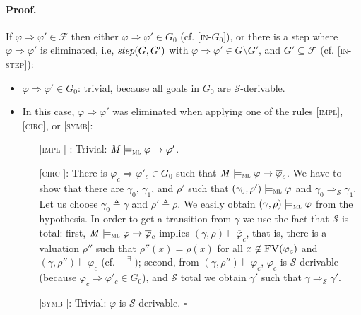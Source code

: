 \documentclass[conference]{IEEEtran}
\newcommand{\M}{\mathit{M}}
\newcommand{\eqbydef}{\triangleq}
\newcommand{\F}{\mathcal{F}}
\renewcommand{\S}{\mathcal{S}}
\newcommand{\tran}[2]{\Ra^{\!#1}_{\!#2}}
\newcommand{\Ra}{\Rightarrow}
\newcommand{\FreeVars}{\mathit{\textsc{FV}}}
\renewcommand{\implies}{\rightarrow}
\newcommand{\ML}{\textsc{ml}\xspace}
\newcommand{\rrule}[2]{{#1} \Ra{#2}}
\newcommand{\modelsml}{\models_\ML}
\newcommand{\coq}[1]{{\small \textit{#1}}}
\begin{document}
\paragraph{Proof.}
If $\rrule{\varphi}{\varphi'} \in \F$ then either $\rrule{\varphi}{\varphi'} \in G_0$ (cf. [\textsc{in-$G_0$}]), or there is a step where $\rrule{\varphi}{\varphi'}$ is eliminated, i.e, $\coq{step}(G, G')$ with $\rrule{\varphi}{\varphi'} \in G\!\setminus\!G'$, and  $G' \subseteq \F$ (cf. [\textsc{in-step}]):

\begin{itemize}
\item $\rrule{\varphi}{\varphi'} \in G_0$: trivial, because all goals in $G_0$  are $\S$-derivable.
\item %
In this case, $\rrule{\varphi}{\varphi'}$ was eliminated when applying one of the rules [\textsc{impl}], [\textsc{circ}], or [\textsc{symb}]:
\begin{enumerate}
\item [[\textsc{impl}\!\!]] : Trivial: $\M \modelsml \varphi \implies \varphi'$.
\item [[\textsc{circ}\!\!]]: There is $\rrule{\varphi_c}{\varphi'_c} \in G_0$ such that $\M \modelsml \varphi \implies \overline{\varphi}_c$.
We have to show that there are $\gamma_0$, $\gamma_1$, and $\rho'$ such that $(\gamma_0, \rho')\modelsml\varphi$ and $\gamma_0\tran{}{\S} \gamma_1$. 
Let us choose $\gamma_0 \eqbydef \gamma$ and $\rho' \eqbydef \rho$. 
We easily obtain $(\gamma, \rho)\modelsml \varphi$ from the hypothesis.
In order to get a transition from $\gamma$ we use the fact that $\S$ is total:
first, $\M \modelsml \varphi \implies \overline{\varphi}_c$ implies $(\gamma, \rho)\models \overline{\varphi}_c$, that is, there is a valuation $\rho''$ 
such that $\rho''(x) = \rho(x)$ for all $x \not\in\FreeVars(\varphi_c)$ and $(\gamma, \rho'')\models \varphi_c$ (cf. $\models^\exists$); second, from $(\gamma, \rho'')\models \varphi_c$, $\varphi_c$ is $\S$-derivable (because $\rrule{\varphi_c}{\varphi'_c} \in G_0$), and $\S$ total we obtain $\gamma'$ such that $\gamma\tran{}{\S}\gamma'$.
\item [[\textsc{symb}\!\!] ]: Trivial: $\varphi$ is $\S$-derivable. \hfill$\square$\\
\end{enumerate}
\end{itemize}
\end{document}

